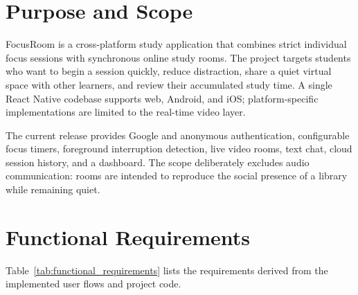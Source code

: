 \section{Purpose and Scope}
FocusRoom is a cross-platform study application that combines strict individual focus sessions with synchronous online study rooms. The project targets students who want to begin a session quickly, reduce distraction, share a quiet virtual space with other learners, and review their accumulated study time. A single React Native codebase supports web, Android, and iOS; platform-specific implementations are limited to the real-time video layer.

The current release provides Google and anonymous authentication, configurable focus timers, foreground interruption detection, live video rooms, text chat, cloud session history, and a dashboard. The scope deliberately excludes audio communication: rooms are intended to reproduce the social presence of a library while remaining quiet.

\section{Functional Requirements}
Table~\ref{tab:functional_requirements} lists the requirements derived from the implemented user flows and project code.

